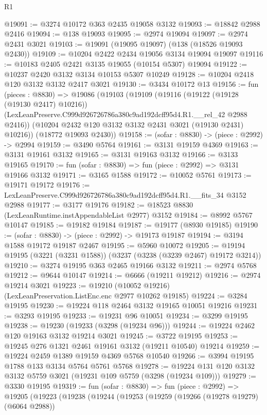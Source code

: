 \begin{lexlean}{R1}
\begin{coremodule}
@19091 := @3274 @10172 @363 @2435 @19058 @3132
@19093 := @18842 @2988 @2416
@19094 := @138 @19093
@19095 := @2974 @19094
@19097 := @2974 @2431 @3021
@19103 := @19091 (@19095 @19097) (@138 (@18526 @19093 @2430))
@19109 := @10204 @2422 @2434 @19056 @3134 @19094 @19097
@19116 := @10183 @2405 @2421 @3135 @19055 (@10154 @5307) @19094
@19122 := @10237 @2420 @3132 @3134 @10153 @5307 @10249
@19128 := @10204 @2418 @120 @3132 @3132 @2417 @3021
@19130 := @3434 @10172 @13
@19156 := fun (pieces : @8830) =>
  @19086
    (@19103
      (@19109
        (@19116
          (@19122 (@19128 (@19130 @2417) @10216))
          (LexLeanPreserve.C999d926726786a380c9ad192dcff95d4.R1.__rel_42 @2988 @2416))
        (@10204 @2432 @120 @3132 @3132 @2431 @3021 (@19130 @2431) @10216))
      (@18772 @19093 @2430))
@19158 := (sofar : @8830) -> (piece : @2992) -> @2994
@19159 := @3490 @5764
@19161 := @3131 @19159 @4369
@19163 := @3131 @19161 @3132
@19165 := @3131 @19163 @3132
@19166 := @3133 @19165
@19170 := fun (sofar : @8830) => fun (piece : @2992) => @3131 @19166 @3132
@19171 := @3165 @1588
@19172 := @10052 @5761
@19173 := @19171 @19172
@19176 := LexLeanPreserve.C999d926726786a380c9ad192dcff95d4.R1.__fits_34 @3152 @2988
@19177 := @3177 @19176
@19182 := @18523 @8830 (LexLeanRuntime.instAppendableList @2977) @3152
@19184 := @8992 @5767 @10147
@19185 := @19182 @19184
@19187 := @19177 (@8930 @19185)
@19190 := (sofar : @8830) -> (piece : @2992) -> @19173 @19187
@19194 := @3194 @1588 @19172 @19187 @2467
@19195 := @5960 @10072
@19205 := @19194 @19195 (@3221 (@3231 @1588)) (@3237 (@3238 (@3239 @2467) @19172 @3214))
@19210 := @3274 @19195 @363 @2465 @19166 @3132
@19211 := @2974 @5768
@19212 := @9644 @10147
@19214 := @6666 (@19211 @19212)
@19216 := @2974 @19214 @3021
@19223 := @19210 (@10052 @19216) (LexLeanPreservation.ListEnc.enc @2977 @10262 @19185)
@19224 := @3284 @19195
@19230 := @19224 @118 @2464 @3132 @19165 @10051 @19216
@19231 := @3293 @19195
@19233 := @19231 @96 @10051
@19234 := @3299 @19195
@19238 := @19230 (@19233 (@3298 (@19234 @96)))
@19244 := @19224 @2462 @120 @19163 @3132 @19214 @3021
@19245 := @3722 @19195
@19253 := @19245 @276 @1321 @2461 @19161 @3132 (@19211 @10540) @19214
@19259 := @19224 @2459 @1389 @19159 @4369 @5768 @10540
@19266 := @3994 @19195 @1788 @133 @3134 @5764 @5761 @5768
@19278 := @19224 @131 @120 @3132 @3132 @5759 @3021 (@19231 @109 @5759 (@3298 (@19234 @109)))
@19279 := @3330 @19195
@19319 := fun (sofar : @8830) =>
  fun (piece : @2992) =>
  @19205
    (@19223
      (@19238
        (@19244
          (@19253
            (@19259
              (@19266 (@19278 @19279) (@6064 @2988))

\end{coremodule}
\end{lexlean}
